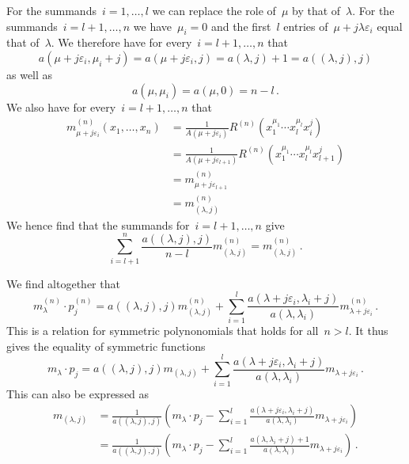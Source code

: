 \documentclass[a4paper, 11pt, twoside=semi]{scrartcl}
\begin{document}
For the summands~$i = 1, \dotsc, l$ we can replace the role of~$\mu$ by that of~$\lambda$.
For the summands~$i = l+1, \dotsc, n$ we have~$\mu_i = 0$ and the first~$l$ entries of~$\mu + j \lambda \varepsilon_i$ equal that of~$\lambda$.
We therefore have for every~$i = l+1, \dotsc, n$ that
\[
  a(\mu + j \varepsilon_i, \mu_i + j)
  =
  a(\mu + j \varepsilon_i, j)
  =
  a(\lambda, j) + 1
  =
  a((\lambda, j), j)
\]
as well as
\[
  a(\mu, \mu_i)
  =
  a(\mu, 0)
  =
  n - l \,.
\]
We also have for every~$i = l+1, \dotsc, n$ that
\begin{align*}
  m^{(n)}_{\mu + j \varepsilon_i}(x_1, \dotsc, x_n)
  &=
  \frac{1}{A(\mu + j \varepsilon_i)}
  R^{(n)}(x_1^{\mu_1} \dotsm x_l^{\mu_l} x_i^j)
  \\
  &=
  \frac{1}{A(\mu + j\varepsilon_{l+1})}
  R^{(n)}(x_1^{\mu_1} \dotsm x_l^{\mu_l} x_{l+1}^j)
  \\
  &=
  m^{(n)}_{\mu + j \varepsilon_{l+1}}
  \\
  &=
  m^{(n)}_{(\lambda, j)}
\end{align*}
We hence find that the summands for~$i = l+1, \dotsc, n$ give
\[
  \sum_{i=l+1}^n \frac{ a((\lambda, j), j) }{ n-l } m^{(n)}_{(\lambda, j)}
  =
  m^{(n)}_{(\lambda, j)} \,.
\]

We find altogether that
\[
  m^{(n)}_\lambda \cdot p^{(n)}_j
  =
  a((\lambda, j), j)
  m^{(n)}_{(\lambda, j)}
  +
  \sum_{i=1}^l
  \frac{ a(\lambda + j \varepsilon_i, \lambda_i + j) }{ a(\lambda, \lambda_i) } 
  m^{(n)}_{\lambda + j \varepsilon_i} \,.
\]
This is a relation for symmetric polynonomials that holds for all~$n > l$.
It thus gives the equality of symmetric functions
\[
  m_\lambda \cdot p_j
  =
  a((\lambda, j), j)
  m_{(\lambda, j)}
  +
  \sum_{i=1}^l
  \frac{ a(\lambda + j \varepsilon_i, \lambda_i + j) }{ a(\lambda, \lambda_i) } 
  m_{\lambda + j \varepsilon_i} \,.
\]
This can also be expressed as
\begin{align}
  m_{(\lambda, j)}
  &=
  \frac{1}{a((\lambda, j), j)}
  \left(
    m_\lambda \cdot p_j
    -
    \sum_{i=1}^l
    \frac{ a(\lambda + j \varepsilon_i, \lambda_i + j) }{ a(\lambda, \lambda_i) } 
    m_{\lambda + j \varepsilon_i}
  \right)
  \\
  &=
  \frac{1}{a((\lambda, j), j)}
  \left(
    m_\lambda \cdot p_j
    -
    \sum_{i=1}^l
    \frac{ a(\lambda, \lambda_i + j) + 1 }{ a(\lambda, \lambda_i) } 
    m_{\lambda + j \varepsilon_i}
  \right) \,.
\end{align}
\end{document}
